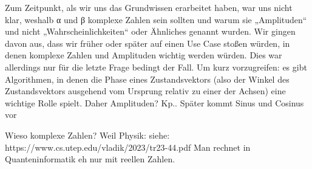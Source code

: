 Zum Zeitpunkt, als wir uns das Grundwissen erarbeitet haben, war uns nicht klar, weshalb α und β komplexe Zahlen sein sollten und warum sie „Amplituden“ und nicht „Wahrscheinlichkeiten“ oder Ähnliches genannt wurden. Wir gingen davon aus, dass wir früher oder später auf einen Use Case stoßen würden, in denen komplexe Zahlen und Amplituden wichtig werden würden. Dies war allerdings nur für die letzte Frage bedingt der Fall. Um kurz vorzugreifen: es gibt Algorithmen, in denen die Phase eines Zustandsvektors (also der Winkel des Zustandsvektors ausgehend vom Ursprung relativ zu einer der Achsen) eine wichtige Rolle spielt. Daher Amplituden? Kp.. Später kommt Sinus und Cosinus vor   

Wieso komplexe Zahlen? Weil Physik: siehe: https://www.cs.utep.edu/vladik/2023/tr23-44.pdf Man rechnet in Quanteninformatik eh nur mit reellen Zahlen.

